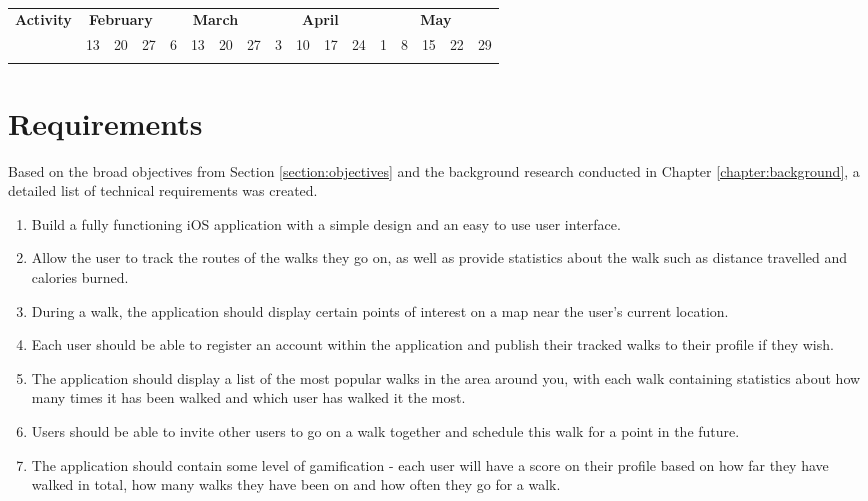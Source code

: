 \begin{table}[hbt]
  \centering
  \begin{tabular}{|c|| *{16}{c|}}
    \hline
    \multirow{2}{*}{\textbf{Activity}} & \multicolumn{3}{c|}{\textbf{February}} & \multicolumn{4}{c|}{\textbf{March}} & \multicolumn{4}{c|}{\textbf{April}} & \multicolumn{5}{c|}{\textbf{May}}\\
    \cline{2-17}
    & 13 & 20 & 27 & 6 & 13 & 20 & 27 & 3 & 10 & 17 & 24 & 1 & 8 & 15 & 22 & 29\\
    \hline
    \hline
    &&&&&&&&&&&&&&&&\\
    \hline
  \end{tabular}
  \caption{}
  \label{table:implementation-plan}
\end{table}

\section{Requirements} \label{section:requirements}

Based on the broad objectives from Section \ref{section:objectives} and the background research conducted in Chapter \ref{chapter:background}, a detailed list of technical requirements was created.


\begin{enumerate}[label=\textbf{Req \arabic*}]
    \item Build a fully functioning iOS application with a simple design and an easy to use user interface.
    \item Allow the user to track the routes of the walks they go on, as well as provide statistics about the walk such as distance travelled and calories burned.
    \item During a walk, the application should display certain points of interest on a map near the user's current location.
    \item Each user should be able to register an account within the application and publish their tracked walks to their profile if they wish.
    \item The application should display a list of the most popular walks in the area around you, with each walk containing statistics about how many times it has been walked and which user has walked it the most.
    \item Users should be able to invite other users to go on a walk together and schedule this walk for a point in the future.
    \item The application should contain some level of gamification - each user will have a score on their profile based on how far they have walked in total, how many walks they have been on and how often they go for a walk.
\end{enumerate}

